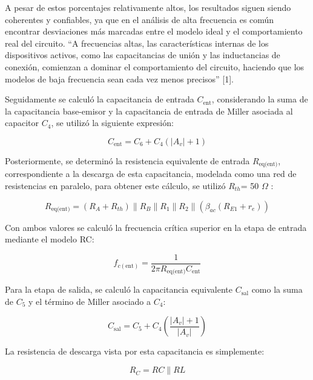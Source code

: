 \documentclass[journal]{IEEEtran}
\begin{document}
A pesar de estos porcentajes relativamente altos, los resultados siguen siendo coherentes y confiables, ya que en el análisis de alta frecuencia es común encontrar desviaciones más marcadas entre el modelo ideal y el comportamiento real del circuito. ``A frecuencias altas, las características internas de los dispositivos activos, como las capacitancias de unión y las inductancias de conexión, comienzan a dominar el comportamiento del circuito, haciendo que los modelos de baja frecuencia sean cada vez menos precisos'' [1].

\par Seguidamente se calculó la capacitancia de entrada $C_{\text{ent}}$, considerando la suma de la capacitancia base-emisor y la capacitancia de entrada de Miller asociada al capacitor $C_4$, se utilizó la siguiente expresión:

\begin{equation}
C_{\text{ent}} = C_6 + C_4(|A_v| + 1)
\end{equation}

Posteriormente, se determinó la resistencia equivalente de entrada $R_{\text{eq(ent)}}$, correspondiente a la descarga de esta capacitancia, modelada como una red de resistencias en paralelo, para obtener este cálculo, se utilizó $R_{th}$= 50 $\Omega$ :

\begin{equation}
R_{\text{eq(ent)}} = (R_A + R_{th}) \parallel R_B \parallel R_1 \parallel R_2 \parallel \left(\beta_{ac} (R_{E1}+r_e)\right)
\end{equation}

Con ambos valores se calculó la frecuencia crítica superior en la etapa de entrada mediante el modelo RC:

\begin{equation}
f_{c(\text{ent})} = \frac{1}{2\pi R_{\text{eq(ent)}} C_{\text{ent}}}
\end{equation}

Para la etapa de salida, se calculó la capacitancia equivalente $C_{\text{sal}}$ como la suma de $C_5$ y el término de Miller asociado a $C_4$:

\begin{equation}
C_{\text{sal}} = C_5 + C_4 \left( \frac{|A_v| + 1}{|A_v|} \right)
\end{equation}

La resistencia de descarga vista por esta capacitancia es simplemente:

\begin{equation}
R_C = RC \parallel RL
\end{equation}
\end{document}
